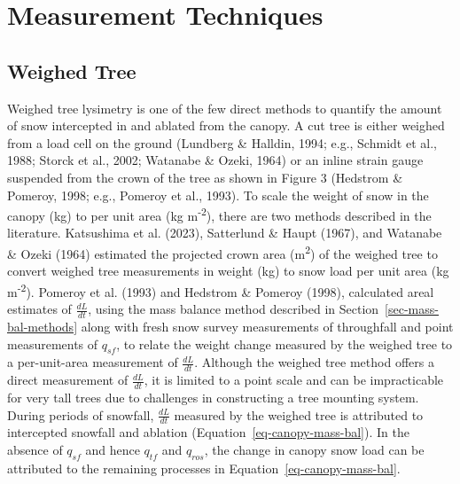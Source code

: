 \documentclass[
  letterpaper,
]{tex/uofsthesis-cs}
\begin{document}
\section{Measurement Techniques}\label{sec-methods}

\subsection{Weighed Tree}\label{weighed-tree}

Weighed tree lysimetry is one of the few direct methods to quantify the
amount of snow intercepted in and ablated from the canopy. A cut tree is
either weighed from a load cell on the ground (Lundberg \& Halldin,
1994; e.g., Schmidt et al., 1988; Storck et al., 2002; Watanabe \&
Ozeki, 1964) or an inline strain gauge suspended from the crown of the
tree as shown in Figure 3 (Hedstrom \& Pomeroy, 1998; e.g., Pomeroy et
al., 1993). To scale the weight of snow in the canopy (kg) to per unit
area (kg m\textsuperscript{-2}), there are two methods described in the
literature. Katsushima et al. (2023), Satterlund \& Haupt (1967), and
Watanabe \& Ozeki (1964) estimated the projected crown area
(m\textsuperscript{2}) of the weighed tree to convert weighed tree
measurements in weight (kg) to snow load per unit area (kg
m\textsuperscript{-2}). Pomeroy et al. (1993) and Hedstrom \& Pomeroy
(1998), calculated areal estimates of \(\frac{dL}{dt}\), using the mass
balance method described in Section~\ref{sec-mass-bal-methods} along
with fresh snow survey measurements of throughfall and point
measurements of \(q_{sf}\), to relate the weight change measured by the
weighed tree to a per-unit-area measurement of \(\frac{dL}{dt}\).
Although the weighed tree method offers a direct measurement of
\(\frac{dL}{dt}\), it is limited to a point scale and can be
impracticable for very tall trees due to challenges in constructing a
tree mounting system. During periods of snowfall, \(\frac{dL}{dt}\)
measured by the weighed tree is attributed to intercepted snowfall and
ablation (Equation~\ref{eq-canopy-mass-bal}). In the absence of
\(q_{sf}\) and hence \(q_{tf}\) and \(q_{ros}\), the change in canopy
snow load can be attributed to the remaining processes in
Equation~\ref{eq-canopy-mass-bal}.
\end{document}
